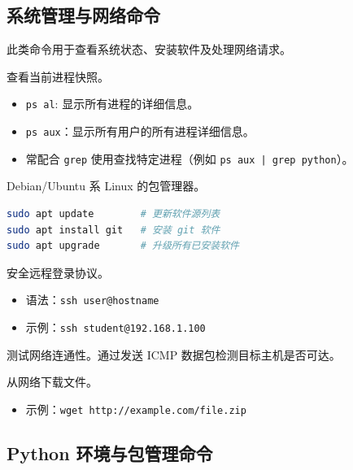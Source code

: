\documentclass[12pt, a4paper]{article}
\begin{document}
\subsection{系统管理与网络命令}

此类命令用于查看系统状态、安装软件及处理网络请求。

\begin{description}[style=multiline, leftmargin=3cm, font=\bfseries\ttfamily]
    \item[ps] 查看当前进程快照。
    \begin{itemize}
        \item \texttt{ps al}: 显示所有进程的详细信息。
        \item \texttt{ps aux}：显示所有用户的所有进程详细信息。
        \item 常配合 \texttt{grep} 使用查找特定进程（例如 \texttt{ps aux | grep python}）。
    \end{itemize}

    \item[apt] Debian/Ubuntu 系 Linux 的包管理器。
    \begin{lstlisting}[language=bash, style=mystyle]
sudo apt update        # 更新软件源列表
sudo apt install git   # 安装 git 软件
sudo apt upgrade       # 升级所有已安装软件
    \end{lstlisting}

    \item[ssh] 安全远程登录协议。
    \begin{itemize}
        \item 语法：\texttt{ssh user@hostname}
        \item 示例：\texttt{ssh student@192.168.1.100}
    \end{itemize}

    \item[ping] 测试网络连通性。通过发送 ICMP 数据包检测目标主机是否可达。
   
    \item[wget] 从网络下载文件。
    \begin{itemize}
        \item 示例：\texttt{wget http://example.com/file.zip}
    \end{itemize}
\end{description}

\subsection{Python 环境与包管理命令}
\end{document}
